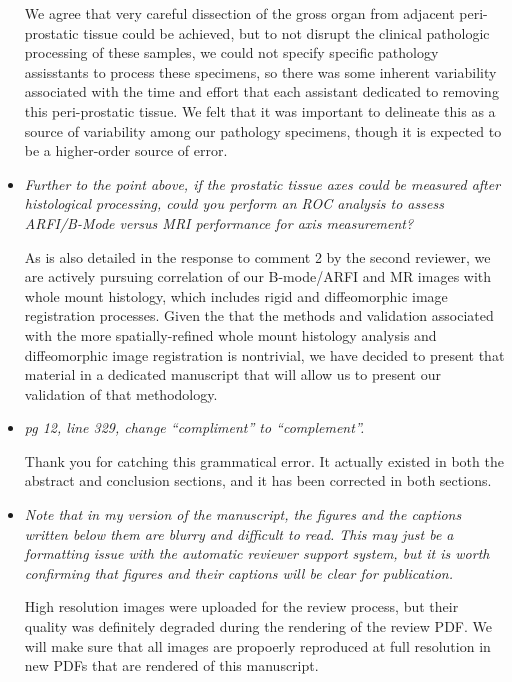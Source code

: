 \documentclass[10pt]{article}
\begin{document}
\begin{itemize}
    We agree that very careful dissection of the gross organ from adjacent
    peri-prostatic tissue could be achieved, but to not disrupt the clinical
    pathologic processing of these samples, we could not specify specific
    pathology assisstants to process these specimens, so there was some
    inherent variability associated with the time and effort that each
    assistant dedicated to removing this peri-prostatic tissue.  We felt that
    it was important to delineate this as a source of variability among our
    pathology specimens, though it is expected to be a higher-order source of
    error.

    \item \textit{Further to the point above, if the prostatic tissue axes
            could be measured after histological processing, could you perform
            an ROC analysis to assess ARFI/B-Mode versus MRI performance for
            axis measurement?}

    As is also detailed in the response to comment 2 by the second reviewer, we
    are actively pursuing correlation of our B-mode/ARFI and MR images with
    whole mount histology, which includes rigid and diffeomorphic image
    registration processes.  Given the that the methods and validation
    associated with the more spatially-refined whole mount histology analysis
    and diffeomorphic image registration is nontrivial, we have decided to
    present that material in a dedicated manuscript that will allow us to
    present our validation of that methodology.

    \item \textit{pg 12, line 329, change ``compliment'' to ``complement''.}

    Thank you for catching this grammatical error.  It actually existed in both
    the abstract and conclusion sections, and it has been corrected in both
    sections.

    \item \textit{Note that in my version of the manuscript, the figures and
            the captions written below them are blurry and difficult to read.
            This may just be a formatting issue with the automatic reviewer
            support system, but it is worth confirming that figures and their
            captions will be clear for publication.}

    High resolution images were uploaded for the review process, but their
    quality was definitely degraded during the rendering of the review PDF.  We
    will make sure that all images are propoerly reproduced at full resolution
    in new PDFs that are rendered of this manuscript.

\end{itemize}
\end{document}
